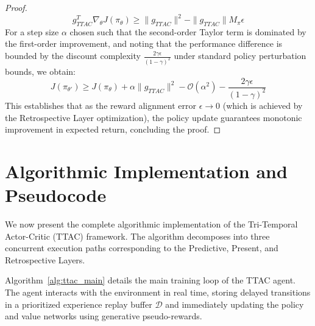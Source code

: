 \documentclass[manuscript, screen, review]{jair}
\begin{document}
\begin{proof}
\begin{equation*}
    g_{TTAC}^T \nabla_\theta J(\pi_\theta) \ge \| g_{TTAC} \|^2 - \| g_{TTAC} \| M_\pi \epsilon
\end{equation*}
For a step size $\alpha$ chosen such that the second-order Taylor term is dominated by the first-order improvement, and noting that the performance difference is bounded by the discount complexity $\frac{2\gamma \epsilon}{(1-\gamma)^2}$ under standard policy perturbation bounds, we obtain:
\begin{equation*}
    J(\pi_{\theta'}) \ge J(\pi_\theta) + \alpha \| g_{TTAC} \|^2 - \mathcal{O}(\alpha^2) - \frac{2 \gamma \epsilon}{(1-\gamma)^2}
\end{equation*}
This establishes that as the reward alignment error $\epsilon \to 0$ (which is achieved by the Retrospective Layer optimization), the policy update guarantees monotonic improvement in expected return, concluding the proof.
\end{proof}

\section{Algorithmic Implementation and Pseudocode}\label{sec:algorithm}
We now present the complete algorithmic implementation of the Tri-Temporal Actor-Critic (TTAC) framework. The algorithm decomposes into three concurrent execution paths corresponding to the Predictive, Present, and Retrospective Layers.

Algorithm~\ref{alg:ttac_main} details the main training loop of the TTAC agent. The agent interacts with the environment in real time, storing delayed transitions in a prioritized experience replay buffer $\mathcal{D}$ and immediately updating the policy and value networks using generative pseudo-rewards.
\end{document}
